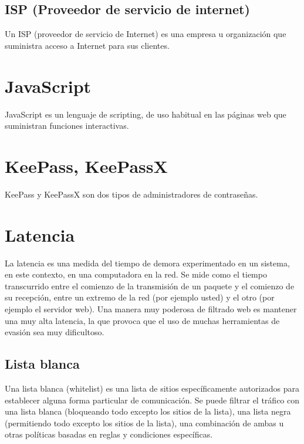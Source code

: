 \subsection{ISP (Proveedor de servicio de
internet)}\label{isp-proveedor-de-servicio-de-internet}

Un ISP (proveedor de servicio de Internet) es una empresa u organización
que suministra acceso a Internet para sus clientes.

\section{JavaScript}\label{javascript}

JavaScript es un lenguaje de scripting, de uso habitual en las páginas
web que suministran funciones interactivas.

\section{KeePass, KeePassX}\label{keepass-keepassx}

KeePass y KeePassX son dos tipos de administradores de contraseñas.

\section{Latencia}\label{latencia}

La latencia es una medida del tiempo de demora experimentado en un
sistema, en este contexto, en una computadora en la red. Se mide como el
tiempo transcurrido entre el comienzo de la transmisión de un paquete y
el comienzo de su recepción, entre un extremo de la red (por ejemplo
usted) y el otro (por ejemplo el servidor web). Una manera muy poderosa
de filtrado web es mantener una muy alta latencia, la que provoca que el
uso de muchas herramientas de evasión sea muy dificultoso.

\subsection{Lista blanca}\label{lista-blanca}

Una lista blanca (whitelist) es una lista de sitios específicamente
autorizados para establecer alguna forma particular de comunicación. Se
puede filtrar el tráfico con una lista blanca (bloqueando todo excepto
los sitios de la lista), una lista negra (permitiendo todo excepto los
sitios de la lista), una combinación de ambas u otras políticas basadas
en reglas y condiciones específicas.


